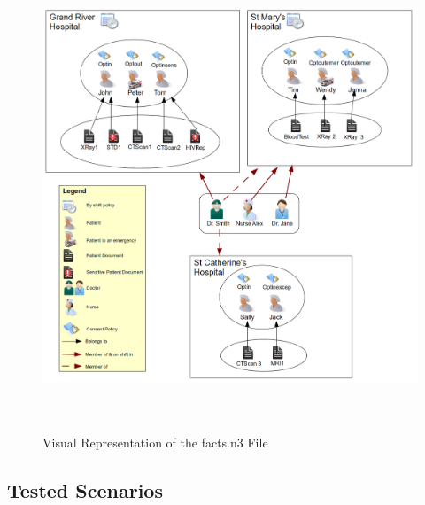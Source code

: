\documentclass[conference]{IEEEtran}
\begin{document}
\begin{figure}[t]
\centering
\includegraphics[width=16cm,height=14cm]{BigPicture.png}
\caption{Visual Representation of the facts.n3 File}
\label{fig:allfacts}
\end{figure}



\subsection{Tested Scenarios}
\end{document}
